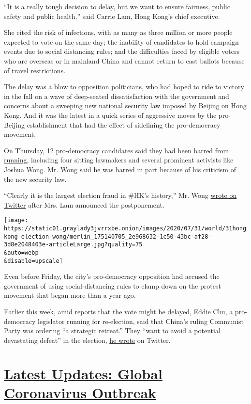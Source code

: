 ``It is a really tough decision to delay, but we want to ensure
fairness, public safety and public health,'' said Carrie Lam, Hong
Kong's chief executive.

She cited the risk of infections, with as many as three million or more
people expected to vote on the same day; the inability of candidates to
hold campaign events due to social distancing rules; and the
difficulties faced by eligible voters who are overseas or in mainland
China and cannot return to cast ballots because of travel restrictions.

The delay was a blow to opposition politicians, who had hoped to ride to
victory in the fall on a wave of deep-seated dissatisfaction with the
government and concerns about a sweeping new national security law
imposed by Beijing on Hong Kong. And it was the latest in a quick series
of aggressive moves by the pro-Beijing establishment that had the effect
of sidelining the pro-democracy movement.

On Thursday,
\href{https://www.nytimes3xbfgragh.onion/2020/07/29/world/asia/hong-kong-arrests-security-law.html}{12
pro-democracy candidates said they had been barred from running},
including four sitting lawmakers and several prominent activists like
Joshua Wong. Mr. Wong said he was barred in part because of his
criticism of the new security law.

``Clearly it is the largest election fraud in \#HK's history,'' Mr. Wong
\href{https://twitter.com/joshuawongcf/status/1289147160009887745}{wrote
on Twitter} after Mrs. Lam announced the postponement.

\texttt{[image: https://static01.graylady3jvrrxbe.onion/images/2020/07/31/world/31hongkong-election-wong/merlin\_175140705\_2e968632-1c50-43bc-af28-3d8e2048403e-articleLarge.jpg?quality=75\\\&auto=webp\\\&disable=upscale]}

Even before Friday, the city's pro-democracy opposition had accused the
government of using social-distancing rules to clamp down on the protest
movement that began more than a year ago.

Earlier this week, amid reports that the vote might be delayed, Eddie
Chu, a pro-democracy legislator running for re-election, said that
China's ruling Communist Party was ordering ``a strategic retreat.''
They ``want to avoid a potential devastating defeat'' in the election,
\href{https://twitter.com/ChuHoiDick/status/1287939279302193157}{he
wrote} on Twitter.

\hypertarget{latest-updates-global-coronavirus-outbreak}{%
\section{\texorpdfstring{\href{https://www.nytimes3xbfgragh.onion/2020/08/01/world/coronavirus-covid-19.html?action=click\&pgtype=Article\&state=default\&region=MAIN_CONTENT_1\&context=storylines_live_updates}{Latest
Updates: Global Coronavirus
Outbreak}}{Latest Updates: Global Coronavirus Outbreak}}\label{latest-updates-global-coronavirus-outbreak}}

